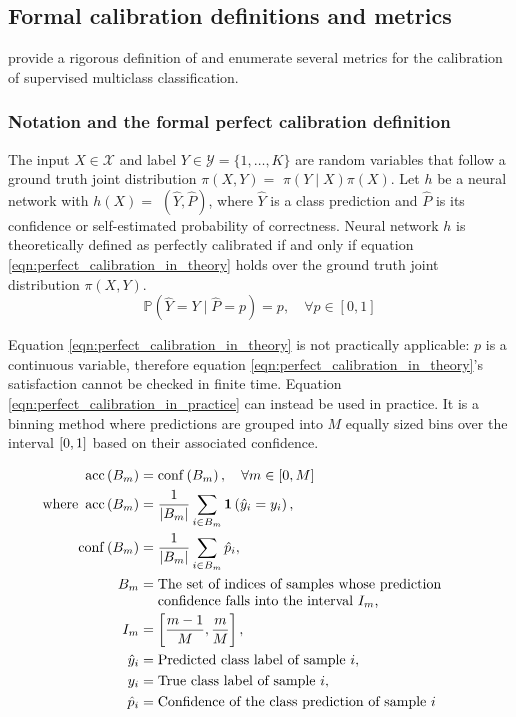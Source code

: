 \subsection{Formal calibration definitions and metrics}
\cite{guo2017calibration} provide a rigorous definition of and enumerate several metrics for the calibration of supervised multiclass classification.

\subsubsection{Notation and the formal perfect calibration definition}
The input $X \in \mathcal{X}$ and label $Y \in \mathcal{Y}=\{1, \ldots, K\}$ are random variables that follow a ground truth joint distribution $\pi(X, Y)=$ $\pi(Y \mid X) \pi(X)$. Let $h$ be a neural network with $h(X)=$ $(\hat{Y}, \hat{P})$, where $\hat{Y}$ is a class prediction and $\hat{P}$ is its confidence or self-estimated probability of correctness. Neural network $h$ is theoretically defined as perfectly calibrated if and only if equation \ref{eqn:perfect_calibration_in_theory} holds over the ground truth joint distribution $\pi(X, Y)$.
\begin{equation}
  \label{eqn:perfect_calibration_in_theory}
  \mathbb{P}(\hat{Y}=Y \mid \hat{P}=p)=p, \quad \forall p \in[0,1]
\end{equation}

Equation \ref{eqn:perfect_calibration_in_theory} is not practically applicable: $p$ is a continuous variable, therefore equation \ref{eqn:perfect_calibration_in_theory}'s satisfaction cannot be checked in finite time. Equation \ref{eqn:perfect_calibration_in_practice} can instead be used in practice. It is a binning method where predictions are grouped into $M$ equally sized bins over the interval $\interval{0}{1}$ based on their associated confidence.

\begin{align}
  \label{eqn:perfect_calibration_in_practice}
  \operatorname{acc}\left(B_{m}\right) &= \operatorname{conf}\left(B_{m}\right), \quad \forall m \in[0,M] \\ \nonumber
  \text{where}~\operatorname{acc}\left(B_{m}\right) &= \frac{1}{\left|B_{m}\right|} \sum_{i \in B_{m}} \mathbf{1}\left(\hat{y}_{i}=y_{i}\right), \\ \nonumber
  \operatorname{conf}\left(B_{m}\right) &= \frac{1}{\left|B_{m}\right|} \sum_{i \in B_{m}} \hat{p}_{i}, \\ \nonumber
  B_{m} &= \parbox[t]{8cm}{\raggedright The set of indices of samples whose prediction confidence falls into the interval $I_{m}$,} \\ \nonumber
  I_{m} &= \left[\frac{m-1}{M}, \frac{m}{M}\right], \\ \nonumber
  \hat{y}_{i} &= \text{Predicted class label of sample $i$}, \\ \nonumber
  y_{i} &= \text{True class label of sample $i$}, \\ \nonumber
  \hat{p}_{i} &= \text{Confidence of the class prediction of sample $i$}
\end{align}

